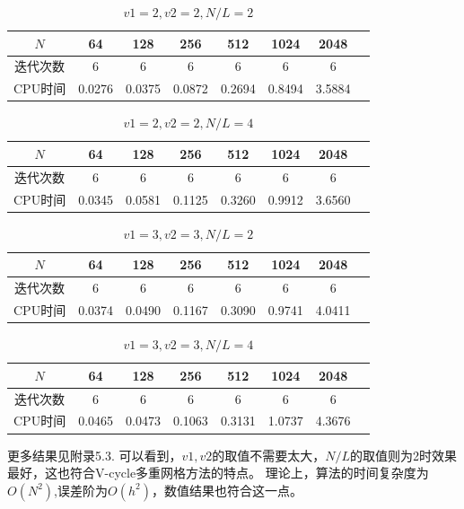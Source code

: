 \documentclass{article}
\begin{document}
\begin{table}[!h]
  \centering
  \caption{$v1 = 2, v2 = 2, N/L = 2$}
  \begin{tabular}{cccccccc}
    \toprule
    $N$ & 64 & 128 & 256 & 512 & 1024 & 2048  \\
    \midrule
    迭代次数 & 6 & 6 & 6 & 6 & 6 & 6  \\
    CPU时间 & 0.0276 & 0.0375 & 0.0872 & 0.2694 & 0.8494 & 3.5884 \\
    \bottomrule
  \end{tabular}
\end{table}

\begin{table}[!h]
  \centering
  \caption{$v1 = 2, v2 = 2, N/L = 4$}
  \begin{tabular}{cccccccc}
    \toprule
    $N$ & 64 & 128 & 256 & 512 & 1024 & 2048  \\
    \midrule
    迭代次数 & 6 & 6 & 6 & 6 & 6 & 6  \\
    CPU时间 & 0.0345 & 0.0581 & 0.1125 & 0.3260 & 0.9912 & 3.6560  \\
    \bottomrule
  \end{tabular}
\end{table}

\begin{table}[!h]
  \centering
  \caption{$v1 = 3, v2 = 3, N/L = 2$}
  \begin{tabular}{cccccccc}
    \toprule
    $N$ & 64 & 128 & 256 & 512 & 1024 & 2048 \\
    \midrule
    迭代次数 & 6 & 6 & 6 & 6 & 6 & 6  \\
    CPU时间 & 0.0374 & 0.0490 & 0.1167 & 0.3090 & 0.9741 & 4.0411  \\
    \bottomrule
  \end{tabular}
\end{table}

\begin{table}[!h]
  \centering
  \caption{$v1 = 3, v2 = 3, N/L = 4$}
  \begin{tabular}{cccccccc}
    \toprule
    $N$ & 64 & 128 & 256 & 512 & 1024 & 2048 \\
    \midrule
    迭代次数 & 6 & 6 & 6 & 6 & 6 & 6  \\
    CPU时间 & 0.0465 & 0.0473 & 0.1063 & 0.3131 & 1.0737 & 4.3676  \\
    \bottomrule
  \end{tabular}
\end{table}
\newpage
更多结果见附录5.3. 可以看到，$v1, v2$的取值不需要太大，$N/L$的取值则为2时效果最好，这也符合V-cycle多重网格方法的特点。
理论上，算法的时间复杂度为$O(N^2)$,误差阶为$O(h^2)$，数值结果也符合这一点。
\end{document}

